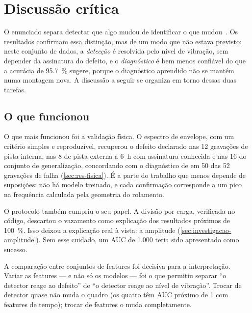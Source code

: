 \chapter{Discussão crítica}
\label{cap:discussao}

O enunciado separa detectar que algo mudou de identificar o que
mudou~\cite{enunciado2026}. Os resultados confirmam essa distinção, mas de um modo
que não estava previsto: neste conjunto de dados, a \emph{detecção} é resolvida
pelo nível de vibração, sem depender da assinatura do defeito, e o
\emph{diagnóstico} é bem menos confiável do que a acurácia de \SI{95.7}{\percent}
sugere, porque o diagnóstico aprendido não se mantém numa montagem nova. A discussão a seguir se organiza em torno dessas
duas tarefas.

\section{O que funcionou}
\label{sec:funcionou}

O que mais funcionou foi a validação física. O espectro de envelope, com um
critério simples e reproduzível, recuperou o defeito declarado nas 12 gravações de pista interna,
nas 8 de pista externa a 6~h com assinatura conhecida e nas 16 do conjunto de
generalização, concordando com o diagnóstico de \textcite{smith2015} em 50 das 52
gravações de falha (\autoref{sec:res-fisica}). É a parte do trabalho que menos
depende de suposições: não há modelo treinado, e cada confirmação corresponde a
um pico na frequência calculada pela geometria do rolamento.

O protocolo também cumpriu o seu papel. A divisão por carga, verificada no
código, descartou o
vazamento como explicação dos resultados próximos de \SI{100}{\percent}. Isso
deixou a explicação real à vista: a amplitude (\autoref{sec:investigacao-amplitude}).
Sem esse cuidado, um AUC de \num{1.000} teria sido apresentado como sucesso.

A comparação entre conjuntos de features foi decisiva para a interpretação.
Variar as features --- e não só os modelos --- foi o que permitiu separar ``o detector reage ao defeito'' de ``o
detector reage ao nível de vibração''. Trocar de detector quase não muda o
quadro (os quatro têm AUC próximo de 1 com features de tempo); trocar de
features o muda completamente.

